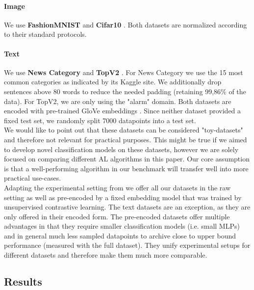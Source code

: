 \documentclass[]{article}
\begin{document}
\paragraph{Image}
We use \textbf{FashionMNIST} \cite{xiao2017fashion} and \textbf{Cifar10} \cite{krizhevsky2009learning}.
Both datasets are normalized according to their standard protocols. 

\paragraph{Text}
We use \textbf{News Category} \cite{misra2022news} and \textbf{TopV2} \cite{chen-etal-2020-low-resource}.
For News Category we use  the 15 most common categories as indicated by its Kaggle site.
We additionally drop sentences above 80 words to reduce the needed padding (retaining 99,86\% of the data).
For TopV2, we are only using the "alarm" domain.
Both datasets are encoded with pre-trained GloVe embeddings \cite{pennington2014glove}.
Since neither dataset provided a fixed test set, we randomly split 7000 datapoints into a test set. \\ [3mm]
%
We would like to point out that these datasets can be considered "toy-datasets" and therefore not relevant for practical purposes.
This might be true if we aimed to develop novel classification models on these datasets, however we are solely focused on comparing different AL algorithms in this paper.
Our core assumption is that a well-performing algorithm in our benchmark will transfer well into more practical use-cases. \\ [1mm]
Adapting the experimental setting from \cite{hacohen2022active} we offer all our datasets in the raw setting as well as pre-encoded by a fixed embedding model that was trained by unsupervised contrastive learning. 
The text datasets are an exception, as they are only offered in their encoded form.
The pre-encoded datasets offer multiple advantages in that they require smaller classification models (i.e. small MLPs) and in general much less sampled datapoints to archive close to upper bound performance (measured with the full dataset).
They unify experimental setups for different datasets and therefore make them much more comparable.

\subsection{Results}
\end{document}
